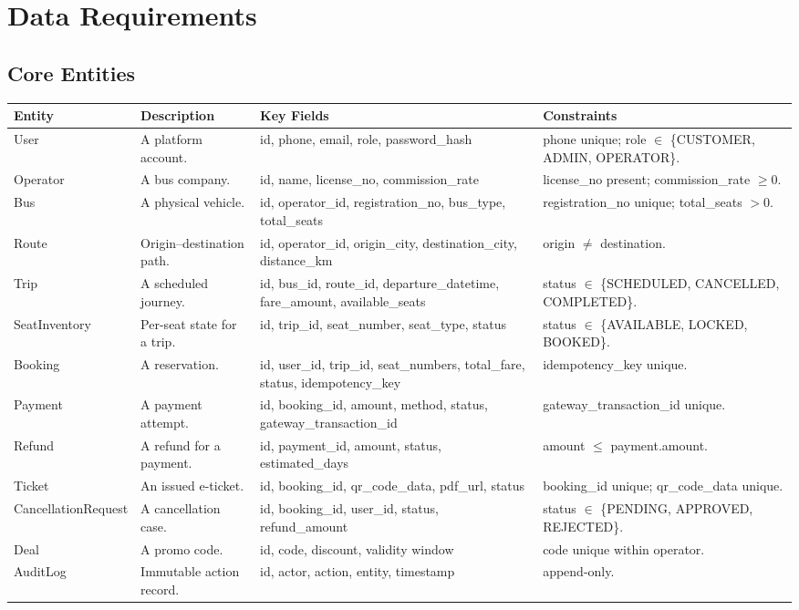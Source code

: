 \documentclass[11pt,a4paper]{article}
\newcommand{\rowstyle}{\rowcolor{headergray}}
\begin{document}
\section{Data Requirements}

\subsection{Core Entities}
\begin{longtable}{p{2.7cm} Y Y Y}
\toprule
\rowstyle \textbf{Entity} & \textbf{Description} & \textbf{Key Fields} & \textbf{Constraints} \\
\midrule
\endhead
User & A platform account. & id, phone, email, role, password\_hash & phone unique; role $\in$ \{CUSTOMER, ADMIN, OPERATOR\}. \\
Operator & A bus company. & id, name, license\_no, commission\_rate & license\_no present; commission\_rate $\geq 0$. \\
Bus & A physical vehicle. & id, operator\_id, registration\_no, bus\_type, total\_seats & registration\_no unique; total\_seats $> 0$. \\
Route & Origin--destination path. & id, operator\_id, origin\_city, destination\_city, distance\_km & origin $\neq$ destination. \\
Trip & A scheduled journey. & id, bus\_id, route\_id, departure\_datetime, fare\_amount, available\_seats & status $\in$ \{SCHEDULED, CANCELLED, COMPLETED\}. \\
SeatInventory & Per-seat state for a trip. & id, trip\_id, seat\_number, seat\_type, status & status $\in$ \{AVAILABLE, LOCKED, BOOKED\}. \\
Booking & A reservation. & id, user\_id, trip\_id, seat\_numbers, total\_fare, status, idempotency\_key & idempotency\_key unique. \\
Payment & A payment attempt. & id, booking\_id, amount, method, status, gateway\_transaction\_id & gateway\_transaction\_id unique. \\
Refund & A refund for a payment. & id, payment\_id, amount, status, estimated\_days & amount $\leq$ payment.amount. \\
Ticket & An issued e-ticket. & id, booking\_id, qr\_code\_data, pdf\_url, status & booking\_id unique; qr\_code\_data unique. \\
CancellationRequest & A cancellation case. & id, booking\_id, user\_id, status, refund\_amount & status $\in$ \{PENDING, APPROVED, REJECTED\}. \\
Deal & A promo code. & id, code, discount, validity window & code unique within operator. \\
AuditLog & Immutable action record. & id, actor, action, entity, timestamp & append-only. \\
\bottomrule
\end{longtable}
\end{document}
